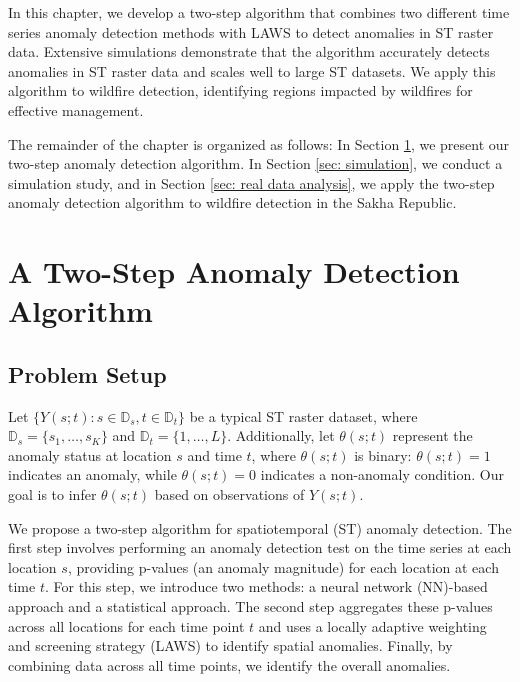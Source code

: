 \documentclass[11pt]{article}
\begin{document}
In this chapter, we develop a two-step algorithm that combines two different time series anomaly detection methods with LAWS to detect anomalies in ST raster data. Extensive simulations demonstrate that the algorithm accurately detects anomalies in ST raster data and scales well to large ST datasets. We apply this algorithm to wildfire detection, identifying regions impacted by wildfires for effective management.



The remainder of the chapter is organized as follows:
In Section \ref{sec: spatiotemporal anomaly detection}, we present our two-step anomaly detection algorithm.
In Section \ref{sec: simulation}, we conduct a simulation study, and in Section \ref{sec: real data analysis}, we apply the two-step anomaly detection algorithm to wildfire detection in the Sakha Republic.



\section{A Two-Step Anomaly Detection Algorithm}\label{sec: spatiotemporal anomaly detection}

\subsection{Problem Setup}
Let $\{Y(s;t): s \in \mathbb{D}_s, t \in \mathbb{D}_t\}$ be a typical ST raster dataset, where $\mathbb{D}_s = \{s_1, \ldots, s_K\}$ and $\mathbb{D}_t = \{1,\ldots, L\}$. Additionally, let $\theta(s;t)$ represent the anomaly status at location $s$ and time $t$, where $\theta(s;t)$ is binary: $\theta(s;t) = 1$ indicates an anomaly, while $\theta(s;t) = 0$ indicates a non-anomaly condition. Our goal is to infer $\theta(s;t)$ based on observations of $Y(s;t)$.



We propose a two-step algorithm for spatiotemporal (ST) anomaly detection. The first step involves performing an anomaly detection test on the time series at each location $s$, providing p-values (an anomaly magnitude) for each location at each time $t$. For this step, we introduce two methods: a neural network (NN)-based approach and a statistical approach. The second step aggregates these p-values across all locations for each time point $t$ and uses a locally adaptive weighting and screening strategy (LAWS) to identify spatial anomalies. Finally, by combining data across all time points, we identify the overall anomalies. 
\end{document}
